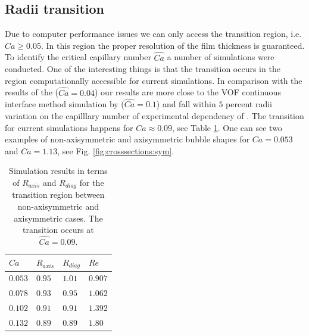 \documentclass{article}
\begin{document}
\subsection{Radii transition}
Due to computer performance issues we can only access the
transition region, i.e. $Ca\geq 0.05$. In this region the proper resolution of the film thickness
is guaranteed. To identify the critical capillary number $\widehat{Ca}$ a number of simulations
were conducted. One of the interesting things is that the transition occurs in the region
computationally accessible for
current simulations. In comparison with the results of the \citet{heil-threedim}
($\widehat{Ca}=0.04$) our
results are more close to the VOF continuous interface method simulation by
\citet{wang-non-circular} ($\widehat{Ca}=0.1$) and fall within $5$ percent radii variation on the
capilllary number of experimental dependency of
\citet{shikazono-square}. The transition for current simulations happens for $Ca\approx 0.09$, see
Table
\ref{table:transition:results}.  One can see
two examples of non-axisymmetric and axisymmetric bubble shapes for $Ca=0.053$ and $Ca=1.13$, see
Fig.
\ref{fig:crosssections:sym}.  
\begin{table}
\begin{tabularx}{\textwidth}{|X|X|X|X|}%
\hline
$Ca$&$R_{axis}$&$R_{diag}$&$Re$\\ %
\hline
$0.053$&$0.95$&$1.01$&$0.907$\\%
$0.078$&$0.93$&$0.95$&$1.062$\\%
$0.102$&$0.91$&$0.91$&$1.392$\\
$0.132$&$0.89$&$0.89$&$1.80$\\%
\hline
\end{tabularx}
\caption{Simulation results in terms of $R_{axis}$ and $R_{diag}$ for the transition region between
non-axisymmetric and axisymmetric cases. The transition occurs at $\widehat{Ca}=0.09$.
\label{table:transition:results}}
\end{table}
\end{document}
